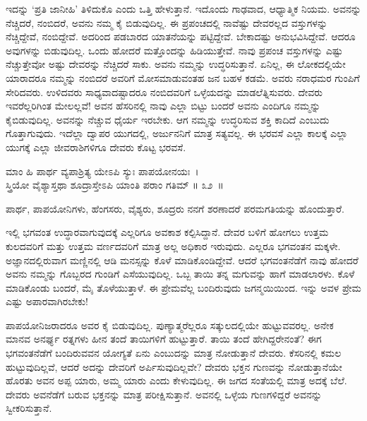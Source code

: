 ಇದನ್ನು ‘ಪ್ರತಿ ಜಾನೀಹಿ’ ತಿಳಿದುಕೊ ಎಂದು ಒತ್ತಿ ಹೇಳುತ್ತಾನೆ. ಇದೊಂದು ಗಾಢವಾದ, ಆಧ್ಯಾತ್ಮಿಕ ನಿಯಮ. ಅವನನ್ನು ನೆಚ್ಚಿದರೆ, ನಂಬಿದರೆ, ಅವನು ನಮ್ಮ ಕೈ ಬಿಡುವುದಿಲ್ಲ. ಈ ಪ್ರಪಂಚದಲ್ಲಿ ನಾವೆಷ್ಟು ದೇವರಲ್ಲದ ವಸ್ತುಗಳನ್ನು ನೆಚ್ಚಿದ್ದೇವೆ, ನಂಬಿದ್ದೇವೆ. ಅದರಿಂದ ಪಡಬಾರದ ಯಾತನೆಯನ್ನು ಪಟ್ಟಿದ್ದೇವೆ. ಬೇಕಾದಷ್ಟು ಅನುಭವಿಸಿದ್ದೇವೆ. ಆದರೂ ಅವುಗಳನ್ನು ಬಿಡುವುದಿಲ್ಲ. ಒಂದು ಹೋದರೆ ಮತ್ತೊಂದನ್ನು ಹಿಡಿಯುತ್ತೇವೆ. ನಾವು ಪ್ರಪಂಚ ವಸ್ತುಗಳನ್ನು ಎಷ್ಟು ನೆಚ್ಚುತ್ತೇವೋ ಅಷ್ಟು ದೇವರನ್ನು ನೆಚ್ಚಿದರೆ ಸಾಕು. ಅವನು ನಮ್ಮನ್ನು ಉದ್ಧರಿಸುತ್ತಾನೆ. ಏನಿಲ್ಲ, ಈ ಲೋಕದಲ್ಲಿಯೇ ಯಾರಾದರೂ ನಮ್ಮನ್ನು ನಂಬಿದರೆ ಅವರಿಗೆ ಮೋಸಮಾಡುವಂತಹ ಜನ ಬಹಳ ಕಡಮೆ. ಅವರು ನರಾಧಮರ ಗುಂಪಿಗೆ ಸೇರಿದವರು. ಉಳಿದವರು ಸಾಧ್ಯವಾದಷ್ಟಾದರೂ ನಂಬಿದವರಿಗೆ ಒಳ್ಳೆಯದನ್ನು ಮಾಡಲೆತ್ನಿಸುವರು. ದೇವರು ಇವರೆಲ್ಲರಿಗಿಂತ ಮೇಲಲ್ಲವೆ! ಅವನ ಹೆಸರಿನಲ್ಲಿ ನಾವು ಎಲ್ಲಾ ಬಿಟ್ಟು ಬಂದರೆ ಅವನು ಎಂದಿಗೂ ನಮ್ಮನ್ನು ಕೈಬಿಡುವುದಿಲ್ಲ. ಅವನನ್ನು ನೆಚ್ಚುವ ಧೈರ್ಯ ಇರಬೇಕು. ಆಗ ನಮ್ಮನ್ನು ಉದ್ಧರಿಸುವ ಶಕ್ತಿ ಕಾದಿದೆ ಎಂಬುದು ಗೊತ್ತಾಗುವುದು. ಇದೆಲ್ಲಾ ದ್ವಾಪರ ಯುಗದಲ್ಲಿ, ಅರ್ಜುನನಿಗೆ ಮಾತ್ರ ಸತ್ಯವಲ್ಲ. ಈ ಭರವಸೆ ಎಲ್ಲಾ ಕಾಲಕ್ಕೆ ಎಲ್ಲಾ ಯುಗಕ್ಕೆ ಎಲ್ಲಾ ಜೀವರಾಶಿಗಳಿಗೂ ದೇವರು ಕೊಟ್ಟ ಭರವಸೆ.

\begin{shloka}
ಮಾಂ ಹಿ ಪಾರ್ಥ ವ್ಯಪಾಶ್ರಿತ್ಯ ಯೇಽಪಿ ಸ್ಯುಃ ಪಾಪಯೋನಯಃ~।\\ಸ್ತ್ರಿಯೋ ವೈಶ್ಯಾಸ್ತಥಾ ಶೂದ್ರಾಸ್ತೇಽಪಿ ಯಾಂತಿ ಪರಾಂ ಗತಿಮ್ \hfill॥ ೩೨~॥
\end{shloka}

\begin{artha}
ಪಾರ್ಥ, ಪಾಪಯೋನಿಗಳು, ಹೆಂಗಸರು, ವೈಶ್ಯರು, ಶೂದ್ರರು ನನಗೆ ಶರಣಾದರೆ ಪರಮಗತಿಯನ್ನು ಹೊಂದುತ್ತಾರೆ.
\end{artha}

ಇಲ್ಲಿ ಭಗವಂತ ಉದ್ಧಾರವಾಗುವುದಕ್ಕೆ ಎಲ್ಲರಿಗೂ ಅವಕಾಶ ಕಲ್ಪಿಸಿದ್ದಾನೆ. ದೇವರ ಬಳಿಗೆ ಹೋಗಲು ಉತ್ತಮ ಕುಲದವರಿಗೆ ಮತ್ತು ಉತ್ತಮ ವರ್ಣದವರಿಗೆ ಮಾತ್ರ ಅಲ್ಲ ಅಧಿಕಾರ ಇರುವುದು. ಎಲ್ಲರೂ ಭಗವಂತನ ಮಕ್ಕಳೇ. ಅಜ್ಞಾನದಲ್ಲಿರುವಾಗ ಮಣ್ಣಿನಲ್ಲಿ ಆಡಿ ಮನಸ್ಸನ್ನು ಕೊಳೆ ಮಾಡಿಕೊಂಡಿದ್ದೇವೆ. ಆದರೆ ಭಗವಂತನೆಡೆಗೆ ನಾವು ಹೋದರೆ ಅವನು ನಮ್ಮನ್ನು ಗೊಬ್ಬರದ ಗುಂಡಿಗೆ ಎಸೆಯುವುದಿಲ್ಲ. ಒಬ್ಬ ತಾಯಿ ತನ್ನ ಮಗುವನ್ನು ಹಾಗೆ ಮಾಡಲಾರಳು. ಕೊಳೆ ಮಾಡಿಕೊಂಡು ಬಂದರೆ, ಮೈ ತೊಳೆಯುತ್ತಾಳೆ. ಈ ಪ್ರೇಮವೆಲ್ಲ ಬಂದಿರುವುದು ಜಗನ್ಮಯಿಯಿಂದ. ಇನ್ನು ಅವಳ ಪ್ರೇಮ ಎಷ್ಟು ಅಪಾರವಾಗಿರಬೇಕು!

ಪಾಪಯೋನಿಜರಾದರೂ ಅವರ ಕೈ ಬಿಡುವುದಿಲ್ಲ. ಪುಣ್ಯಾತ್ಮರೆಲ್ಲರೂ ಸತ್ಕುಲದಲ್ಲಿಯೇ ಹುಟ್ಟುವವರಲ್ಲ. ಅನೇಕ ಮಾನವ ಅನರ್ಘ್ಯ ರತ್ನಗಳು ಹೀನ ತಂದೆ ತಾಯಿಗಳಿಗೆ ಹುಟ್ಟುತ್ತಾರೆ. ತಾಯಿ ತಂದೆ ಹೇಗಿದ್ದರೇನಂತೆ? ಈಗ ಭಗವಂತನೆಡೆಗೆ ಬಂದಿರುವವನ ಯೋಗ್ಯತೆ ಏನು ಎಂಬುದನ್ನು ಮಾತ್ರ ನೋಡುತ್ತಾನೆ ದೇವರು. ಕೆಸರಿನಲ್ಲಿ ಕಮಲ ಹುಟ್ಟುವುದಿಲ್ಲವೆ, ಆದರೆ ಅದನ್ನು ದೇವರಿಗೆ ಅರ್ಪಿಸುವುದಿಲ್ಲವೇ? ದೇವರು ಭಕ್ತನ ಗುಣವನ್ನು ನೋಡುತ್ತಾನೆಯೇ ಹೊರತು ಅವನ ಅಪ್ಪ ಯಾರು, ಅಮ್ಮ ಯಾರು ಎಂದು ಕೇಳುವುದಿಲ್ಲ. ಈ ಜಗದ ಸಂತೆಯಲ್ಲಿ ಮಾತ್ರ ಅದಕ್ಕೆ ಬೆಲೆ. ದೇವರು ಅವನೆಡೆಗೆ ಬರುವ ಭಕ್ತನನ್ನು ಮಾತ್ರ ಪರೀಕ್ಷಿಸುತ್ತಾನೆ. ಅವನಲ್ಲಿ ಒಳ್ಳೆಯ ಗುಣಗಳಿದ್ದರೆ ಅವನನ್ನು ಸ್ವೀಕರಿಸುತ್ತಾನೆ.

\newpage

